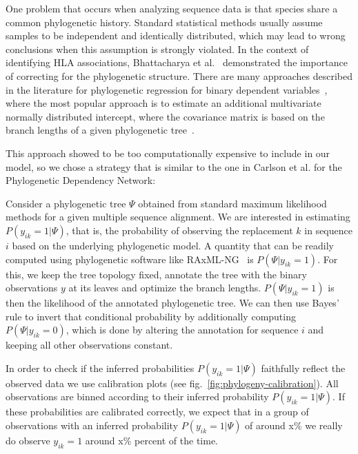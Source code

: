 \documentclass[fleqn,11pt]{SelfArx} %
\begin{document}
One problem that occurs when analyzing sequence data is that species share a common phylogenetic history. Standard statistical methods usually assume samples to be independent and identically distributed, which may lead to wrong conclusions when this assumption is strongly violated.
In the context of identifying HLA associations, Bhattacharya et al.~\cite{Bhattacharya2007} demonstrated the importance of correcting for the phylogenetic structure.
There are many approaches described in the literature for phylogenetic regression for binary dependent variables~\cite{Ives2014}, where the most popular approach is to estimate an additional multivariate normally distributed intercept, where the covariance matrix is based on the branch lengths of a given phylogenetic tree~\cite{Ives2009}.

This approach showed to be too computationally expensive to include in our model, so we chose a strategy that is similar to the one in Carlson et al. \cite{Carlson2008} for the Phylogenetic Dependency Network:

Consider a phylogenetic tree \(\Psi\) obtained from standard maximum likelihood methods for a given multiple sequence alignment. We are interested in estimating \(P(y_{ik}=1|\Psi)\), that is, the probability of observing the replacement \(k\) in sequence \(i\) based on the underlying phylogenetic model.
A quantity that can be readily computed using phylogenetic software like RAxML-NG~\cite{Kozlov2019} is \(P(\Psi|y_{ik}=1)\). For this, we keep the tree topology fixed, annotate the tree with the binary observations \(y\) at its leaves and optimize the branch lengths. \(P(\Psi|y_{ik}=1)\) is then the likelihood of the annotated phylogenetic tree. We can then use Bayes' rule to invert that conditional probability by additionally computing \(P(\Psi|y_{ik}=0)\), which is done by altering the annotation for sequence \(i\) and keeping all other observations constant.

In order to check if the inferred probabilities \(P(y_{ik}=1|\Psi)\) faithfully reflect the observed data we use calibration plots (see fig.~\ref{fig:phylogeny-calibration}). All observations are binned according to their inferred probability \(P(y_{ik}=1|\Psi)\). If these probabilities are calibrated correctly, we expect that in a group of observations with an inferred probability \(P(y_{ik}=1|\Psi)\) of around x\% we really do observe \(y_{ik}=1\) around x\% percent of the time.
\end{document}

